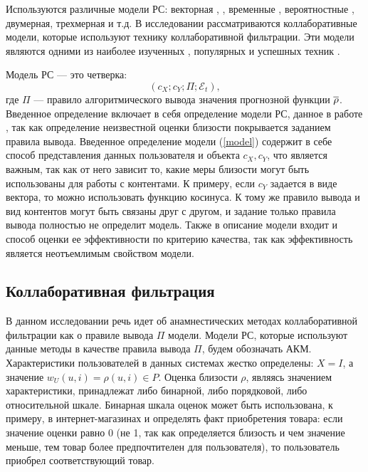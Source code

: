 Используются различные модели РС:
векторная  \cite{empirical-cf},
 \cite{e-commerce,vsm1}, временные \cite{temporal-model},
вероятностные \cite{bayesian-model},
двумерная, трехмерная \cite{2d} и т.д. В исследовании рассматриваются
коллаборативные модели, которые используют технику коллаборативной фильтрации.
Эти модели являются одними из
наиболее изученных  \cite{most-researched, rs-in-compsciense},
популярных  \cite{most-popular, rs-in-compsciense} и успешных техник
\cite{most-success}.

Модель РС --- это четверка:
\begin{equation}
	\label{model}
	(c_X; c_Y; \Pi; \mathcal{E}_{t}),
\end{equation} где
$\Pi$ --- правило алгоритмического вывода значения прогнозной функции $\overline{\rho}$.
Введенное определение включает в себя определение модели РС,
данное в работе \cite{2d},
так как определение неизвестной оценки близости покрывается заданием
правила вывода.
Введенное определение модели (\ref{model})
содержит в себе способ представления данных пользователя и объекта $c_X, c_Y$,
что является важным, так как от него зависит то, какие меры близости могут быть
использованы для работы с контентами. К примеру, если $c_Y$ задается в
виде вектора, то можно использовать функцию косинуса.
К тому же правило вывода и вид контентов могут быть связаны друг с другом,
и задание только правила вывода полностью не определит модель.
Также в описание модели
входит и способ оценки ее эффективности по критерию качества, так как
эффективность является неотъемлимым свойством модели.

\subsection{Коллаборативная фильтрация}
В данном исследовании речь идет об анамнестических методах коллаборативной фильтрации
\cite{cfrs,
item-based, 2d, empirical-cf, coscial-rec-survey, surveyCf, Marlin04collaborativefiltering}
как о правиле вывода $\Pi$ модели.
Модели РС, которые используют данные методы в качестве правила вывода $\Pi$,
будем обозначать АКМ.
Характеристики пользователей в данных системах жестко определены:
$X = I$, а значение $w_U(u, i) = \rho(u, i) \in P$.
Оценка близости $\rho$, являясь значением
характеристики, принадлежат либо бинарной,
либо порядковой, либо относительной шкале.
Бинарная шкала оценок может быть
использована, к примеру, в интернет-магазинах \cite{amazon-item2item} и определять
факт приобретения товара: если значение
оценки равно 0 (не 1, так как определяется близость и чем значение меньше, тем
товар более предпочтителен для пользователя), то пользователь приобрел
соответствующий товар.

